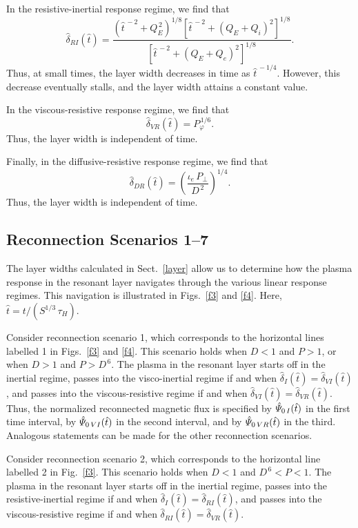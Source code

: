 \documentclass[titlepage=false,12pt]{article}
\begin{document}
In the resistive-inertial response regime, we find that
\begin{equation}\label{deltaRI}
\hat{\delta}_{RI}(\hat{t}) = \frac{\left(\hat{t}^{\,-2}+Q_E^{\,2}\right)^{1/8}\left[\hat{t}^{\,-2}+(Q_E+Q_i)^2\right]^{1/8}}{
\left[\hat{t}^{\,-2}+(Q_E+Q_e)^2\right]^{1/8}}.
\end{equation}
Thus, at small times, the layer width decreases in time as $\hat{t}^{\,-1/4}$. However, this decrease eventually stalls, and the
layer width attains a constant value. 

In the viscous-resistive response regime, we find that
\begin{equation}\label{deltaVR}
\hat{\delta}_{VR}(\hat{t}) =P_\varphi^{\,1/6}.
\end{equation}
Thus, the layer width is independent of time. 

Finally, in the diffusive-resistive response regime, we find that
\begin{equation}\label{deltaDR}
\hat{\delta}_{DR}(\hat{t}) =\left(\frac{\iota_e\,P_\perp}{D^{\,2}}\right)^{1/4}.
\end{equation}
Thus, the layer width is independent of time. 

\subsection{Reconnection Scenarios 1--7}
The layer widths calculated in Sect.~\ref{layer} allow us to determine how the plasma response in the resonant layer
navigates through the various linear response regimes. This navigation is illustrated in Figs.~\ref{f3} and \ref{f4}. Here, $\hat{t}= t/(S^{1/3}\,\tau_H)$. 

Consider reconnection scenario 1, which corresponds to the horizontal lines labelled 1 in Figs.~\ref{f3} and \ref{f4}. 
This scenario holds when $D<1$ and $P>1$, or when  $D>1$ and $P>D^{\,6}$. 
The plasma in the resonant layer starts off in the inertial regime, passes into the visco-inertial regime if and when  $\hat{\delta}_I(\hat{t})=\hat{\delta}_{VI}(\hat{t})$,
and passes into the viscous-resistive regime if and when $\hat{\delta}_{VI}(\hat{t})=\hat{\delta}_{VR}(\hat{t})$. 
Thus, the normalized reconnected magnetic flux is specified by $\hat{\mit\Psi}_{0\,I}(\hat{t})$ in the first time interval,
by $\hat{\mit\Psi}_{0\,VI}(\hat{t})$ in the second interval, and by $\hat{\mit\Psi}_{0\,VR}(\hat{t})$ in the third. Analogous statements can be
made for the other reconnection scenarios.  

Consider reconnection scenario 2, which corresponds to the horizontal line labelled 2 in Fig.~\ref{f3}. 
This scenario holds when $D<1$ and $D^{\,6}<P< 1$. The plasma in the resonant layer starts off in the inertial regime, passes into the resistive-inertial regime if and when $\hat{\delta}_I(\hat{t})=\hat{\delta}_{RI}(\hat{t})$,
and passes into the viscous-resistive regime if and when $\hat{\delta}_{RI}(\hat{t})=\hat{\delta}_{VR}(\hat{t})$. 
\end{document}
